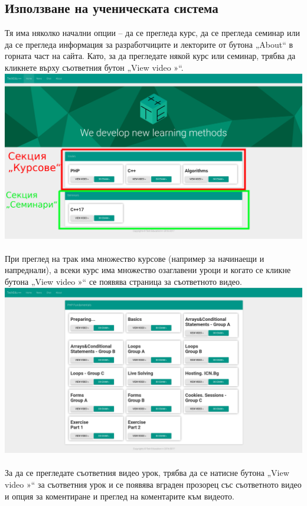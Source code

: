 \documentclass[12pt]{article}
\begin{document}
	\subsection{Използване на ученическата система}
	Тя има няколко начални опции – да се прегледа курс, да се прегледа семинар или да се прегледа информация за разработчиците и лекторите от бутона „About“ в горната част на сайта. Като, за да прегледате някой курс или семинар, трябва да кликнете върху съответния бутон „View video »“.\\
	\includegraphics[width=1\textwidth]{track_view.png}\\
	\\При преглед на трак има множество курсове (например за начинаещи и напреднали), а всеки курс има множество озаглавени уроци и когато се кликне бутона „View video »“ се появява страница за съответното видео.\\
	\includegraphics[width=1\textwidth]{view_details.png}\\
	\\За да се прегледате съответния видео урок, трябва да се натисне бутона „View video »“ за съответния урок и се появява вграден прозорец със съответното видео и опция за коментиране и преглед на коментарите към видеото.\\
\end{document}
